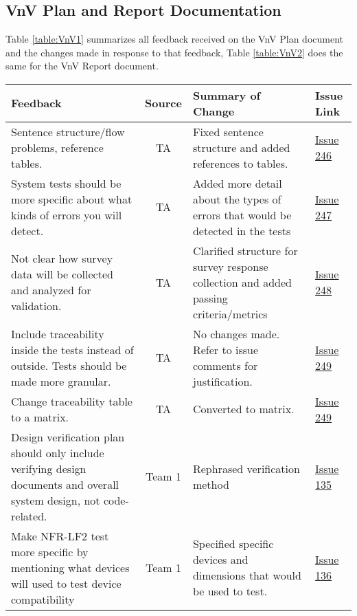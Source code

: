 \documentclass{article}
\begin{document}
\subsection{VnV Plan and Report Documentation}
Table \ref{table:VnV1} summarizes all feedback received on the VnV Plan document
and the changes made in response to that feedback, Table \ref{table:VnV2} does
the same for the VnV Report document.
\begin{table}[H]
\centering
\begin{tabularx}{\textwidth}{|X|c|X|p{1.5cm}|}
    \hline
    \textbf{Feedback} & \textbf{Source} & \textbf{Summary of Change}
    & \textbf{Issue Link} \\
    \hline
    Sentence structure/flow problems, reference tables. & TA & Fixed sentence
    structure and added references to tables. &
    \href{https://github.com/SumanyaG/Alkalytics/issues/246}{Issue 246} \\
    \hline
    System tests should be more specific about what kinds of errors you will
    detect. & TA & Added more detail about the types of errors that would be
    detected in the tests &
    \href{https://github.com/SumanyaG/Alkalytics/issues/247}{Issue 247} \\
    \hline
    Not clear how survey data will be collected and analyzed for validation. &
    TA & Clarified structure for survey response collection and added passing
    criteria/metrics &
    \href{https://github.com/SumanyaG/Alkalytics/issues/248}{Issue 248} \\
    \hline
    Include traceability inside the tests instead of outside. Tests should be
    made more granular. & TA & No changes made. Refer to issue comments for
    justification. &
    \href{https://github.com/SumanyaG/Alkalytics/issues/249}{Issue 249} \\
    \hline
    Change traceability table to a matrix. & TA & Converted to matrix. &
    \href{https://github.com/SumanyaG/Alkalytics/issues/249}{Issue 249} \\
    \hline
    Design verification plan should only include verifying design documents and
    overall system design, not code-related. & Team 1 & Rephrased verification
    method & \href{https://github.com/SumanyaG/Alkalytics/issues/135}{Issue 135}
    \\
    \hline
    Make NFR-LF2 test more specific by mentioning what devices will used to test
    device compatibility & Team 1 & Specified specific devices and dimensions
    that would be used to test. &
    \href{https://github.com/SumanyaG/Alkalytics/issues/136}{Issue 136} \\

\end{tabularx}
\end{table}
\end{document}
